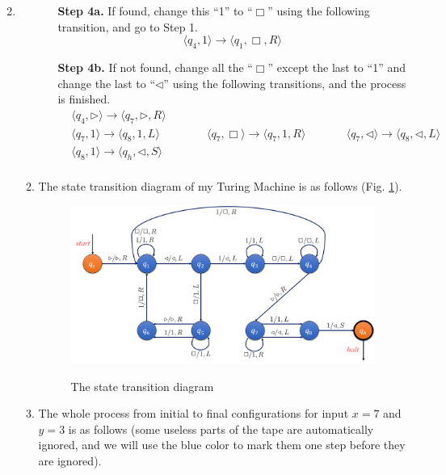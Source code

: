 \documentclass[12pt,a4paper]{article}
\makeatletter
\newtheorem*{solution}{Solution}
\theoremstyle{definition}
\renewenvironment{solution}[1][Solution] {\par\pushQED{\qed}\normalfont\topsep6\p@\@plus6\p@\relax\trivlist\item[\hskip\labelsep\bfseries#1\@addpunct{.}]\ignorespaces}{\popQED\endtrivlist\@endpefalse} \makeatother
\makeatother
\begin{document}
\begin{enumerate}
\begin{solution}
\begin{enumerate}
\begin{itemize}
\item[\textbf{Step 4a.} ] If found, change this ``1'' to ``$\Box$'' using the following transition, and go to Step 1.
\begin{displaymath}
\langle q_4, 1 \rangle \rightarrow \langle q_1, \Box, R\rangle
\end{displaymath}

\item[\textbf{Step 4b.} ] If not found, change all the ``$\Box$'' except the last to ``1'' and change the last to ``$\triangleleft$'' using the following transitions, and the process is finished.
\begin{displaymath}
\begin{aligned}
& \langle q_4, \triangleright \rangle \rightarrow \langle q_7, \triangleright, R\rangle & \\
& \langle q_7, 1 \rangle \rightarrow \langle q_8, 1, L\rangle & \qquad
& \langle q_7, \Box \rangle \rightarrow \langle q_7, 1, R\rangle & \qquad
& \langle q_7, \triangleleft \rangle \rightarrow \langle q_8, \triangleleft, L\rangle & \\
& \langle q_8, 1 \rangle \rightarrow \langle q_h, \triangleleft, S\rangle & \\
\end{aligned}
\end{displaymath}
\end{itemize}
\item The state transition diagram of my Turing Machine is as follows (Fig. \ref{fig1}).
\begin{figure}[htbp]
  \centering
  \includegraphics[width=6in]{state-transition-diagram.png}\\
  \caption{The state transition diagram}\label{fig1}
\end{figure}
\item The whole process from initial to final configurations for input $x = 7$ and $y = 3$ is as follows ({\color{blue}some useless parts of the tape are automatically ignored, and we will use the blue color to mark them one step before they are ignored}).

\end{enumerate}
\end{solution}
\end{enumerate}
\end{document}
